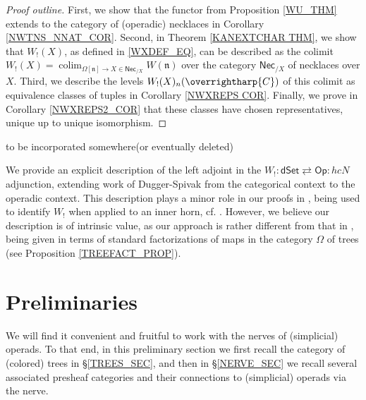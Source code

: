 \documentclass[a4paper,10pt
,draft
]{article}%
\numberwithin{equation}{section}
\numberwithin{figure}{section}
\theoremstyle{definition} %
\newcommand{\vect}[1]{\text{\overrightharp{\ensuremath{#1}}}}
\DeclareMathOperator{\colim}{colim}%
\newcommand{\1}{\ensuremath{\mathbbm 1}}%
\begin{document}
\begin{proof}[Proof outline]
        First, we show that the functor from Proposition \ref{WU_THM} extends to the category of (operadic) necklaces in Corollary \ref{NWTNS_NNAT_COR}.
        Second, in Theorem \ref{KANEXTCHAR THM},
        we show that $W_!(X)$, as defined in \eqref{WXDEF_EQ}, can be described as
        the colimit
        $W_!(X) = \colim_{\Omega[\mathfrak n] \to X \in \mathsf{Nec}_{/ X}} W(\mathfrak n)$
        over the category $\mathsf{Nec}_{/ X}$ of necklaces over $X$.
        Third, we describe the levels $W_!(X)_n(\vect C)$ of this colimit as equivalence classes of tuples
        in Corollary \ref{NWXREPS COR}.
        Finally, we prove in Corollary \ref{NWXREPS2_COR} that these classes have chosen representatives, unique up to unique isomorphism.
\end{proof}




{\color{red} to be incorporated somewhere(or eventually deleted)}


We provide an explicit description of the left adjoint
in the 
$W_! 
\colon 
\mathsf{dSet} 
\rightleftarrows 
\mathsf{Op}
\colon 
hcN$
adjunction,
extending work of Dugger-Spivak \cite{DS11}
from the categorical context to the operadic context.
This description plays a minor role in our proofs 
in \cite[\S \ref{TAS-PFMNTHM SEC}]{BP_TAS},
being used to identify
$W_!$ when applied to an inner horn,
cf. \cite[Lemma \ref{TAS-WLEFTQPUSH LEM}]{BP_TAS}.
However, we believe our description is of intrinsic value,
as our approach is rather different from that in \cite{DS11},
being given in terms of 
standard factorizations of maps in the
category $\Omega$ of trees
(see Proposition \ref{TREEFACT_PROP}).






\section{Preliminaries}

We will find it convenient and fruitful to
work with the nerves of (simplicial) operads.
To that end, in this preliminary section
we first recall the category of (colored) trees in \S \ref{TREES_SEC},
and then in \S \ref{NERVE_SEC} we recall several associated presheaf categories and their connections to (simplicial) operads via the nerve.
\end{document}
